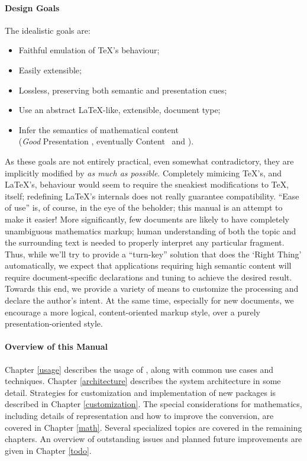 \documentclass{book}
\begin{document}
\paragraph{Design Goals}\label{intro.goals} The idealistic goals are:
\begin{itemize}
\item Faithful emulation of \TeX's behaviour;
\item Easily extensible;
\item Lossless, preserving both semantic and presentation cues;
\item Use an abstract \LaTeX-like, extensible, document type;
\item Infer the semantics of mathematical content\\
    (\emph{Good} Presentation \MathML, eventually Content \MathML\ and \OpenMath).
\end{itemize}

As these goals are not entirely practical, even somewhat contradictory,
they are implicitly modified by \emph{as much as possible}.
Completely mimicing \TeX's, and \LaTeX's, behaviour would seem to require the
sneakiest modifications to \TeX, itself; redefining \LaTeX's internals does 
not really guarantee compatibility. ``Ease of use'' is, of course, in the eye of the beholder;
this manual is an attempt to make it easier!
More significantly, few documents are likely to have completely unambiguous
mathematics markup; human understanding of both the topic and the surrounding 
text is needed to properly interpret any particular fragment.
Thus, while we'll try to provide a ``turn-key'' solution that does the `Right Thing'
automatically, we expect that applications requiring high semantic content will require
document-specific declarations and tuning to achieve the desired result.
Towards this end, we provide a variety
of means to customize the processing and declare the author's intent.
At the same time, especially for new documents, we encourage a more logical, 
content-oriented markup style, over a purely presentation-oriented style.

\paragraph[Overview]{Overview of this Manual}\label{intro.overview}
Chapter \ref{usage} describes the usage of \LaTeXML, along with
common use cases and techniques.  Chapter \ref{architecture} describes
the system architecture in some detail. Strategies for customization
and implementation of new packages is described in Chapter \ref{customization}.
The special considerations for mathematics, including details of representation
and how to improve the conversion, are covered in Chapter \ref{math}.
Several specialized topics are covered in the remaining chapters.
An overview of outstanding issues and planned future improvements
are given in Chapter \ref{todo}.
\end{document}
